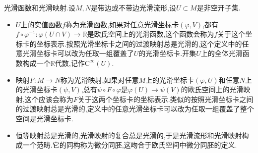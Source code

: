 光滑函数和光滑映射.设$M,N$是带边或不带边光滑流形,设$U\subset M$是非空开子集.
\begin{itemize}
	\item $U$上的实值函数$f$称为光滑函数,如果对任意光滑坐标卡$(\varphi,V)$,都有$f\circ\varphi^{-1}:\varphi(U\cap V)\to\mathbb{R}$是欧氏空间上的光滑函数,这个函数会称为$f$关于这个坐标卡的坐标表示.按照光滑坐标卡之间的过渡映射总是光滑的,这个定义中的任意光滑坐标卡可以改为任取一组覆盖了$U$的光滑坐标卡.开集$U$上的全体光滑函数构成一个$\mathbb{R}$代数,记作$\mathrm{C}^{\infty}(U)$.
	\item 映射$F:M\to N$称为光滑映射,如果对任意$M$上的光滑坐标卡$(\varphi,U)$和任意$N$上的光滑坐标卡$(\psi,V)$,总有$\psi\circ F\circ\varphi$是$\varphi(U)\to\psi(V)$的欧氏空间上的光滑映射,这个应该会称为$F$关于这两个坐标卡的坐标表示.类似的按照光滑坐标卡之间的过渡映射总是光滑的,定义中的任意光滑坐标卡可以改为任取一组覆盖了整个空间是光滑坐标卡.
	\item 恒等映射总是光滑的,光滑映射的复合总是光滑的,于是光滑流形和光滑映射构成一个范畴.它的同构称为微分同胚,这吻合于欧氏空间中微分同胚的定义.
\end{itemize}
